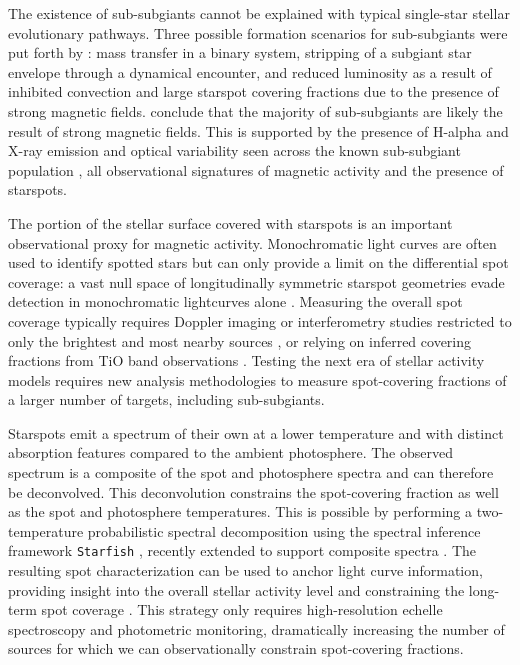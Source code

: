 \documentclass[twocolumn]{emulateapj}%
\begin{document}
The existence of sub-subgiants cannot be explained with typical single-star stellar evolutionary pathways. Three possible formation scenarios for sub-subgiants were put forth by \citet{leiner17}: mass transfer in a binary system, stripping of a subgiant star envelope through a dynamical encounter, and reduced luminosity as a result of inhibited convection and large starspot covering fractions due to the presence of strong magnetic fields. \citet{leiner17} conclude that the majority of sub-subgiants are likely the result of strong magnetic fields. This is supported by the presence of H-alpha and X-ray emission and optical variability seen across the known sub-subgiant population \citep{geller17}, all observational signatures of magnetic activity and the presence of starspots.

The portion of the stellar surface covered with starspots is an important observational proxy for magnetic activity. Monochromatic light curves are often used to identify spotted stars \citep{2014ApJS..211...24M} but can only provide a limit on the differential spot coverage: a vast null space of longitudinally symmetric starspot geometries evade detection in monochromatic lightcurves alone \citep{2019AJ....157...64L}. Measuring the overall spot coverage typically requires Doppler imaging or interferometry studies restricted to only the brightest and most nearby sources \citep{roettenbacher16}, or relying on inferred covering fractions from TiO band observations \citep{oneal96,fang2016,2019AJ....158..101M}. Testing the next era of stellar activity models requires new analysis methodologies to measure spot-covering fractions of a larger number of targets, including sub-subgiants.

Starspots emit a spectrum of their own at a lower temperature and with distinct absorption features compared to the ambient photosphere. The observed spectrum is a composite of the spot and photosphere spectra and can therefore be deconvolved. This deconvolution constrains the spot-covering fraction as well as the spot and photosphere temperatures. This is possible by performing a two-temperature probabilistic spectral decomposition using the spectral inference framework \texttt{Starfish} \citep{czekala15}, recently extended to support composite spectra \citep{gullysantiago17}. The resulting spot characterization can be used to anchor light curve information, providing insight into the overall stellar activity level and constraining the long-term spot coverage \citep{neff95}. This strategy only requires high-resolution echelle spectroscopy and photometric monitoring, dramatically increasing the number of sources for which we can observationally constrain spot-covering fractions.
\end{document}
